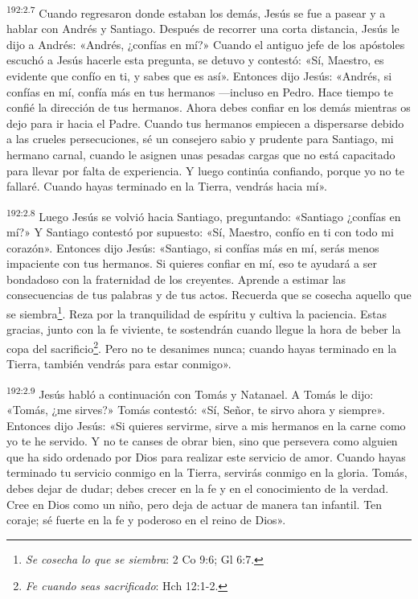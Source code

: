 \par 
\textsuperscript{192:2.7} Cuando regresaron donde estaban los demás, Jesús se fue a pasear y a hablar con Andrés y Santiago. Después de recorrer una corta distancia, Jesús le dijo a Andrés: «Andrés, ¿confías en mí?» Cuando el antiguo jefe de los apóstoles escuchó a Jesús hacerle esta pregunta, se detuvo y contestó: «Sí, Maestro, es evidente que confío en ti, y sabes que es así». Entonces dijo Jesús: «Andrés, si confías en mí, confía más en tus hermanos ---incluso en Pedro. Hace tiempo te confié la dirección de tus hermanos. Ahora debes confiar en los demás mientras os dejo para ir hacia el Padre. Cuando tus hermanos empiecen a dispersarse debido a las crueles persecuciones, sé un consejero sabio y prudente para Santiago, mi hermano carnal, cuando le asignen unas pesadas cargas que no está capacitado para llevar por falta de experiencia. Y luego continúa confiando, porque yo no te fallaré. Cuando hayas terminado en la Tierra, vendrás hacia mí».

\par 
\textsuperscript{192:2.8} Luego Jesús se volvió hacia Santiago, preguntando: «Santiago ¿confías en mí?» Y Santiago contestó por supuesto: «Sí, Maestro, confío en ti con todo mi corazón». Entonces dijo Jesús: «Santiago, si confías más en mí, serás menos impaciente con tus hermanos. Si quieres confiar en mí, eso te ayudará a ser bondadoso con la fraternidad de los creyentes. Aprende a estimar las consecuencias de tus palabras y de tus actos. Recuerda que se cosecha aquello que se siembra\footnote{\textit{Se cosecha lo que se siembra}: 2 Co 9:6; Gl 6:7.}. Reza por la tranquilidad de espíritu y cultiva la paciencia. Estas gracias, junto con la fe viviente, te sostendrán cuando llegue la hora de beber la copa del sacrificio\footnote{\textit{Fe cuando seas sacrificado}: Hch 12:1-2.}. Pero no te desanimes nunca; cuando hayas terminado en la Tierra, también vendrás para estar conmigo».

\par 
\textsuperscript{192:2.9} Jesús habló a continuación con Tomás y Natanael. A Tomás le dijo: «Tomás, ¿me sirves?» Tomás contestó: «Sí, Señor, te sirvo ahora y siempre». Entonces dijo Jesús: «Si quieres servirme, sirve a mis hermanos en la carne como yo te he servido. Y no te canses de obrar bien, sino que persevera como alguien que ha sido ordenado por Dios para realizar este servicio de amor. Cuando hayas terminado tu servicio conmigo en la Tierra, servirás conmigo en la gloria. Tomás, debes dejar de dudar; debes crecer en la fe y en el conocimiento de la verdad. Cree en Dios como un niño, pero deja de actuar de manera tan infantil. Ten coraje; sé fuerte en la fe y poderoso en el reino de Dios».

